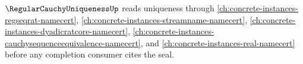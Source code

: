\noindent $\RegularCauchyUniquenessUp$ reads uniqueness through \autoref{ch:concrete-instances-regseqrat-namecert}, \autoref{ch:concrete-instances-streamname-namecert}, \autoref{ch:concrete-instances-dyadicratcore-namecert}, \autoref{ch:concrete-instances-cauchysequenceequivalence-namecert}, and \autoref{ch:concrete-instances-real-namecert} before any completion consumer cites the seal.






